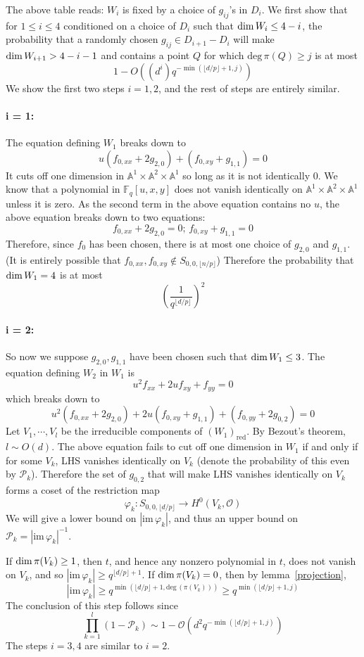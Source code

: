 \documentclass[12pt]{article}
\theoremstyle{plain}
\theoremstyle{definition}
\newcommand{\sP}{\mathcal{P}}
\newcommand{\IA}{\mathbb{A}}
\newcommand{\IF}{\mathbb{F}}
\newcommand{\sO}{\mathcal{O}}
\renewcommand{\deg}{\mathrm{deg}\,}
\renewcommand\dim{{\rm dim\,}}
\newcommand{\<}{\langle}
\renewcommand{\>}{\rangle}
\newcommand{\fl}[1]{\lfloor #1 \rfloor}
\newcommand{\im}{\mathrm{im}\,}
\begin{document}
The above table reads: $W_i$ is fixed by a choice of $g_{ij}$'s in $D_i$. We first show that for $1 \le i \le 4$ conditioned on a choice of $D_i$ such that $\dim W_i \le 4 - i$, the probability that a randomly chosen $g_{ij} \in D_{i + 1} - D_i$ will make $\dim W_{i + 1} > 4 - i - 1$ and contains a point $Q$ for which $\deg \pi(Q) \ge j$ is at most
$$ 1 - O((d^i) q^{-\min(\fl{d/p} + 1, j)}) $$
We show the first two steps $i =1, 2$, and the rest of steps are entirely similar. 

\paragraph{i = 1:} The equation defining $W_1$ breaks down to 
$$ u(f_{0, xx} + 2g_{2, 0}) + (f_{0, xy} + g_{1, 1}) = 0$$ 
It cuts off one dimension in $\IA^1 \times \IA^2 \times \IA^1$ so long as it is not identically $0$. We know that a polynomial in $\IF_q[u, x, y]$ does not vanish identically on $\IA^1 \times \IA^2 \times \IA^1$ unless it is zero. As the second term in the above equation contains no $u$, the above equation breaks down to two equations:
$$ f_{0, xx} + 2g_{2, 0} = 0; \, f_{0, xy} + g_{1, 1} = 0$$
Therefore, since $f_0$ has been chosen, there is at most one choice of $g_{2, 0}$ and $g_{1, 1}$. (It is entirely possible that $f_{0, xx}, f_{0, xy} \not\in S_{0, 0, \fl{n/p}}$) Therefore the probability that $\dim W_1 = 4$ is at most
$$ (\frac{1}{q^{\fl{d/p}}})^2$$
\paragraph{i = 2:} 
So now we suppose $g_{2,0}, g_{1,1}$ have been chosen such that $\dim W_1 \le 3$. The equation defining $W_2$ in $W_1$ is 
$$ u^2 f_{xx} + 2u f_{xy} + f_{yy} = 0 $$
which breaks down to 
$$ u^2(f_{0, xx} + 2 g_{2, 0}) + 2u(f_{0, xy} + g_{1, 1}) + (f_{0, yy} + 2 g_{0, 2}) = 0 $$
Let $V_1, \cdots, V_l$ be the irreducible components of $(W_1)_{\mathrm{red}}$. By Bezout's theorem, $l \sim O(d)$. The above equation fails to cut off one dimension in $W_1$ if and only if for some $V_k$, LHS vanishes identically on $V_k$ (denote the probability of this even by $\sP_k$). Therefore the set of $g_{0, 2}$ that will make LHS vanishes identically on $V_k$ forms a coset of the restriction map 
$$ \varphi_k : S_{0, 0, \fl{d/p}} \to H^0(V_k, \sO) $$
We will give a lower bound on $|\im \varphi_k|$, and thus an upper bound on $\sP_k = |\im \varphi_k|^{-1}$. 

If $\dim \pi(V_k) \ge 1$, then $t$, and hence any nonzero polynomial in $t$, does not vanish on $V_k$, and so $|\im \varphi_k| \ge q^{\fl{d/p} + 1}$. If $\dim \pi(V_k) = 0$, then by lemma~\ref{projection}, 
$$ |\im \varphi_k| \ge q^{\min(\fl{d/p} + 1, \deg(\pi(V_k)))} \ge q^{\min(\fl{d/p} + 1, j)} $$
The conclusion of this step follows since 
$$ \prod_{k = 1}^l (1 - \sP_k) \sim 1 - \sO(d^2 q^{-\min(\fl{d/p} + 1, j)})$$
The steps $i = 3, 4$ are similar to $i = 2$. 
\end{document}
